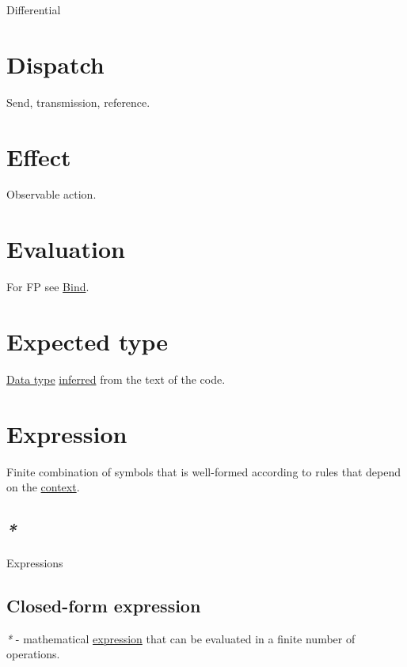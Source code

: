 \documentclass[a4paper,14pt,oneside]{book}
\begin{document}
\label{org586f81e}Differential\\

\chapter{\label{orgb638ed6}Dispatch}
\label{sec:org9f0e23d}
Send, transmission, reference.\\

\chapter{\label{org92840b4}Effect}
\label{sec:org7092265}
Observable action.\\

\chapter{\label{org47e1b12}Evaluation}
\label{sec:org7969298}
For FP see \hyperref[orgc6ab53c]{Bind}.\\

\chapter{\label{orge622053}Expected type}
\label{sec:orgfc48b4b}
\hyperref[orgbde1baf]{Data type} \hyperref[org25743c3]{inferred} from the text of the code.\\

\chapter{\label{org6aa6989}Expression}
\label{sec:org28fc17e}
Finite combination of symbols that is well-formed according to rules that depend on the \hyperref[org34055d8]{context}.\\

\section{\emph{*}}
\label{sec:org74e36fe}

\label{org8896d2c}Expressions\\

\section{\label{orgc89360f}Closed-form expression}
\label{sec:org05e4f93}
\emph{*} - mathematical \hyperref[org6aa6989]{expression} that can be evaluated in a finite number of operations.\\
\end{document}
